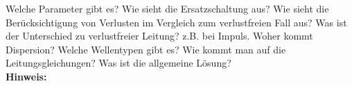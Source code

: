 \begin{question}[section=5,subsection=53,name={Standardmodell für Verlustbehaftete Doppelleiter},difficulty=8,type=mdl,tags={}]
	Welche Parameter gibt es? Wie sieht die Ersatzschaltung aus? Wie sieht die Berücksichtigung von Verlusten im Vergleich zum verlustfreien Fall aus? Was ist der Unterschied zu verlustfreier Leitung? z.B. bei Impuls. Woher kommt Dispersion? Welche Wellentypen gibt es? Wie kommt man auf die Leitungsgleichungen? Was ist die allgemeine Lösung?
	\\ \textbf{Hinweis:}\\
	
\end{question}
\begin{solution}
	
\end{solution}